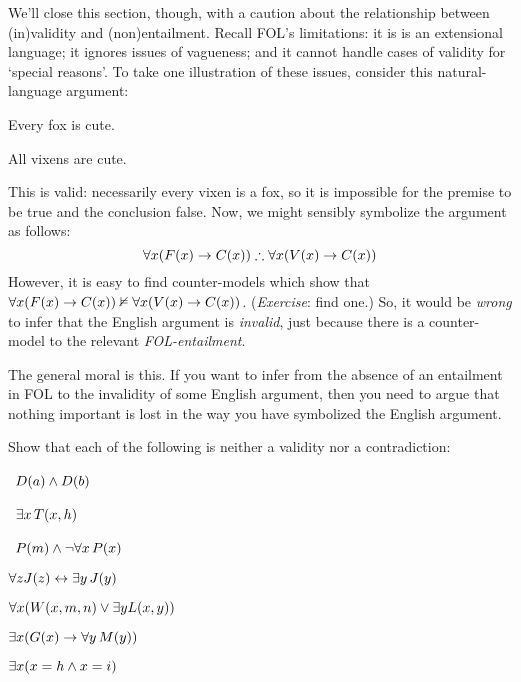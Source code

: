 We'll close this section, though, with a caution about the relationship between (in)validity and (non)entailment. Recall FOL's limitations: it is is an extensional language; it ignores issues of vagueness; and it cannot handle cases of validity for `special reasons'. To take one illustration of these issues, consider this natural-language argument: 
\begin{earg}
	\item[] Every fox is cute.
	\item[\therefore] All vixens are cute.
\end{earg}
This is valid: necessarily every vixen is a fox, so it is impossible for the premise to be true and the conclusion false. Now, we might sensibly symbolize the argument as follows:
$$\forall x(\atom{F}{x} \eif \atom{C}{x}) \therefore \forall x(\atom{V}{x} \eif  \atom{C}{x})$$
However, it is easy to find counter-models which show that $\forall x(\mathord{F}(x) \rightarrow \mathord{C}(x)) \nvDash \forall x(\mathord{V}(x) \rightarrow  \mathord{C}(x))$. (\emph{Exercise}: find one.) So, it would be \emph{wrong} to infer that the English argument is \emph{invalid}, just because there is a counter-model to the relevant \emph{FOL-entailment}.

The general moral is this. If you want to infer from the absence of an entailment in FOL to the invalidity of some English argument, then you need to argue that nothing important is lost in the way you have symbolized the English argument.

\practiceproblems

\solutions
\problempart
\label{pr.Contingent}
Show that each of the following is neither a validity nor a contradiction:
\begin{earg}
\item \leftsolutions\ $\mathord{D}(a)  \wedge \mathord{D}(b)$
\item \leftsolutions\ $\exists x\, \mathord{T}(x,h)$
\item \leftsolutions\ $\mathord{P}(m)  \wedge \neg\forall x\, \mathord{P}(x)$
\item $\forall z \mathord{J}(z) \leftrightarrow \exists y\, \mathord{J}(y)$
\item $\forall x (\mathord{W}(x,m,n) \vee \exists y\mathord{L}(x,y))$
\item $\exists x (\mathord{G}(x) \rightarrow \forall y\, \mathord{M}(y))$
\item $\exists x (x = h \wedge x = i)$
\end{earg}

